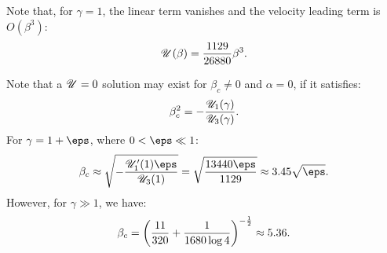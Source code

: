 Note that, for $\gamma = 1$, the linear term vanishes and the velocity leading term is $O(\beta^3)$:
\begin{eqnarray}
\mathscr{U}(\beta) = \frac{1129}{26880}\beta^3.
\end{eqnarray}

Note that a $\mathscr{U} = 0$ solution may exist for $\beta_c \ne 0$ and $\alpha = 0$, 
if it satisfies:
\begin{eqnarray}
\beta_c^2 = -\frac{\mathscr{U}_1(\gamma)}{\mathscr{U}_3(\gamma)}.
\end{eqnarray}
For $\gamma = 1 + \eps$, where $0 < \eps \ll 1$:
\begin{eqnarray}
\beta_c \approx \sqrt{-\frac{\cU_1'(1) \eps}{\cU_3(1)}} = 
 \sqrt{\frac{13440 \eps}{1129}} \approx 3.45 \sqrt{\eps}.
\end{eqnarray}
However, for $\gamma \gg 1$, we have:
\begin{eqnarray}
\beta_c =  \left(\frac{11}{320} + \frac{1}{1680 \log 4}\right)^{-\frac{1}{2}} \approx 5.36.
\end{eqnarray}